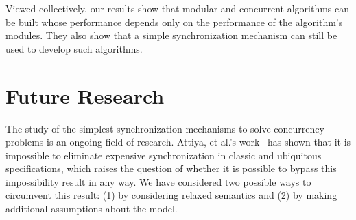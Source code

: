 Viewed collectively, our results show that modular and concurrent algorithms can be built whose performance depends only on the performance of the algorithm's modules. They also show that a simple synchronization mechanism can still be used to develop such algorithms.

\section{Future Research}

The study of the simplest synchronization mechanisms to solve concurrency problems is an ongoing field of research. Attiya, et al.'s work~\cite{DBLP_conf_popl_AttiyaGHKMV11} has shown that it is impossible to eliminate expensive synchronization in classic and ubiquitous specifications, which raises the question of whether it is possible to bypass this impossibility result in any way. We have considered two possible ways to circumvent this result: (1) by considering relaxed semantics and (2) by making additional assumptions about the model.



